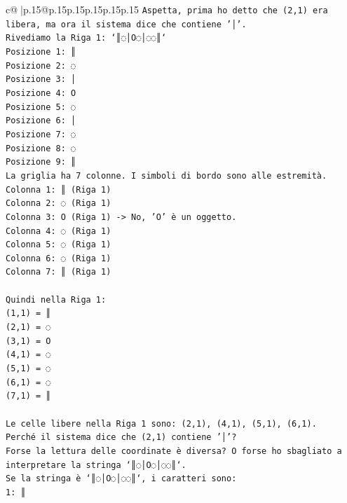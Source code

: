 \documentclass{article}
\begin{document}
{\begin{supertabular}{c@{$\;$}|p{.15\linewidth}@{}p{.15\linewidth}p{.15\linewidth}p{.15\linewidth}p{.15\linewidth}p{.15\linewidth}}
{{{\texttt{Aspetta, prima ho detto che (2,1) era libera, ma ora il sistema dice che contiene '│'.} \\
\texttt{Rivediamo la Riga 1: `║◌│O◌│◌◌║`} \\
\texttt{Posizione 1: ║} \\
\texttt{Posizione 2: ◌} \\
\texttt{Posizione 3: │} \\
\texttt{Posizione 4: O} \\
\texttt{Posizione 5: ◌} \\
\texttt{Posizione 6: │} \\
\texttt{Posizione 7: ◌} \\
\texttt{Posizione 8: ◌} \\
\texttt{Posizione 9: ║} \\
\texttt{La griglia ha 7 colonne. I simboli di bordo sono alle estremità.} \\
\texttt{Colonna 1: ║ (Riga 1)} \\
\texttt{Colonna 2: ◌ (Riga 1)} \\
\texttt{Colonna 3: O (Riga 1) {-}> No, 'O' è un oggetto.} \\
\texttt{Colonna 4: ◌ (Riga 1)} \\
\texttt{Colonna 5: ◌ (Riga 1)} \\
\texttt{Colonna 6: ◌ (Riga 1)} \\
\texttt{Colonna 7: ║ (Riga 1)} \\
\\ 
\texttt{Quindi nella Riga 1:} \\
\texttt{(1,1) = ║} \\
\texttt{(2,1) = ◌} \\
\texttt{(3,1) = O} \\
\texttt{(4,1) = ◌} \\
\texttt{(5,1) = ◌} \\
\texttt{(6,1) = ◌} \\
\texttt{(7,1) = ║} \\
\\ 
\texttt{Le celle libere nella Riga 1 sono: (2,1), (4,1), (5,1), (6,1).} \\
\texttt{Perché il sistema dice che (2,1) contiene '│'?} \\
\texttt{Forse la lettura delle coordinate è diversa? O forse ho sbagliato a interpretare la stringa `║◌│O◌│◌◌║`.} \\
\texttt{Se la stringa è `║◌│O◌│◌◌║`, i caratteri sono:} \\
\texttt{1: ║} \\
}}}
\end{supertabular}}
\end{document}

